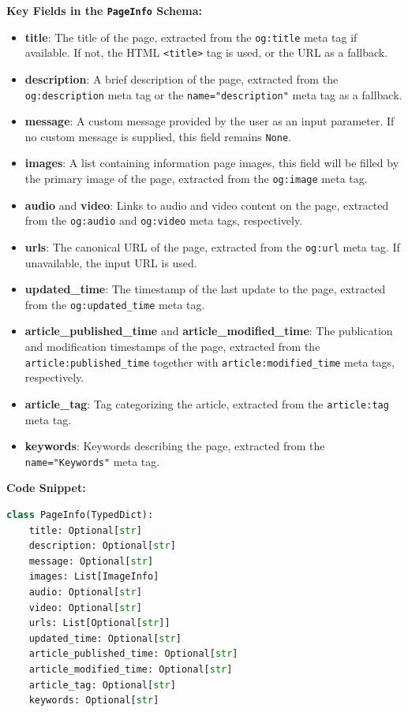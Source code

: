 \textbf{Key Fields in the \texttt{PageInfo} Schema:}
\begin{itemize}
    \item \textbf{title}: The title of the page, extracted from the \texttt{og:title} meta tag if available. If not, the HTML \texttt{<title>} tag is used, or the URL as a fallback.
    \item \textbf{description}: A brief description of the page, extracted from the \texttt{og:description} meta tag or the \texttt{name="description"} meta tag as a fallback.
    \item \textbf{message}: A custom message provided by the user as an input parameter. If no custom message is supplied, this field remains \texttt{None}.
    \item \textbf{images}: A list containing information page images, this field will be filled by the primary image of the page, extracted from the \texttt{og:image} meta tag.
    \item \textbf{audio} and \textbf{video}: Links to audio and video content on the page, extracted from the \texttt{og:audio} and \texttt{og:video} meta tags, respectively.
    \item \textbf{urls}: The canonical URL of the page, extracted from the \texttt{og:url} meta tag. If unavailable, the input URL is used.
    \item \textbf{updated\_time}: The timestamp of the last update to the page, extracted from the \texttt{og:updated\_time} meta tag.
    \item \textbf{article\_published\_time} and \textbf{article\_modified\_time}: The publication and modification timestamps of the page, extracted from the \texttt{article:published\_time} together with \texttt{article:modified\_time} meta tags, respectively.
    \item \textbf{article\_tag}: Tag categorizing the article, extracted from the \texttt{article:tag} meta tag.
    \item \textbf{keywords}: Keywords describing the page, extracted from the \texttt{name="Keywords"} meta tag.
\end{itemize}

\textbf{Code Snippet:}
\begin{lstlisting}[language=Python, caption={PageInfo Schema}, label={lst:pageinfo}]
class PageInfo(TypedDict):
    title: Optional[str]
    description: Optional[str]
    message: Optional[str]
    images: List[ImageInfo]
    audio: Optional[str]
    video: Optional[str]
    urls: List[Optional[str]]
    updated_time: Optional[str]
    article_published_time: Optional[str]
    article_modified_time: Optional[str]
    article_tag: Optional[str]
    keywords: Optional[str]
\end{lstlisting}

